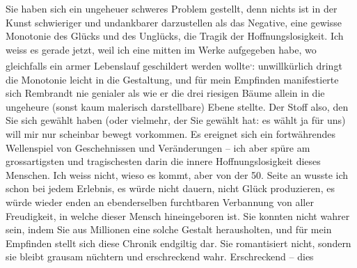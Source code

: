 \pstart
           Sie haben sich ein ungeheuer schweres Problem gestellt, denn nichts ist in der Kunst
               schwieriger und undankbarer darzustellen als das Negative, eine gewisse Monotonie des
               Glücks und des Unglücks, die Tragik der Hoffnungslosigkeit. Ich weiss es gerade
               jetzt, weil ich eine \label{K_L03689-2v}\label{K_L03689-2} mitten im Werke aufgegeben habe, wo
               gleichfalls ein armer Lebenslauf geschildert werden wollte\substVorne{}\textsuperscript{,}\substDazwischen{}:\substHinten{}{ } unwillkürlich dringt die Monotonie leicht in die
               Gestaltung, und für mein Empfinden manifestierte sich Rembrandt nie genialer als wie er die drei riesigen Bäume
               allein in die ungeheure (sonst kaum malerisch darstellbare) Ebene stellte. Der Stoff
               also, den Sie sich gewählt haben (oder vielmehr, der Sie gewählt hat: es wählt ja für
               uns) will mir nur scheinbar \introOben{}\introOben{}bewegt vorkommen. Es ereignet sich ein fortwährendes Wellenspiel von
               Geschehnissen und Veränderungen – ich aber spüre am grossartigsten und tragischesten darin die innere Hoffnungslosigkeit dieses
               Menschen. Ich weiss nicht, wieso es kommt, aber von der 50. Seite an wusste ich schon
               bei jedem Erlebnis, es würde nicht dauern, nicht Glück produzieren, es würde wieder
               enden an ebenderselben {\pb}furchtbaren
               Verbannung von aller Freudigkeit, in welche dieser Mensch hineingeboren ist. Sie
               konnten nicht wahrer sein, indem Sie aus Millionen eine solche Gestalt herausholten,
               und für mein Empfinden stellt sich diese Chronik endgiltig dar. Sie romantisiert
               nicht, sondern sie bleibt grausam nüchtern und erschreckend wahr. Erschreckend – dies
